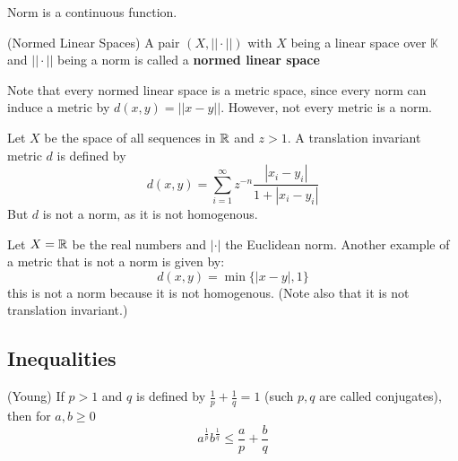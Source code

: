 \documentclass{article}
\begin{document}
\begin{remark}
    Norm is a continuous function.
\end{remark}

\begin{defn}
(Normed Linear Spaces) A pair $(X, ||\cdot||)$ with $X$ being a linear space over $\mathbb{K}$ and 
                    $||\cdot||$ being a norm is called a \textbf{normed linear space}
\end{defn} 

Note that every normed linear space is a metric space, since every norm can induce a metric by $d(x,y)=||x-y||$. 
However, not every metric is a norm.  

\begin{eg}
    Let $X$ be the space of all sequences in $\mathbb{R}$ and $z>1$. A translation invariant metric $d$ is defined by  
    \begin{equation*}
        d(x,y) = \sum_{i=1}^{\infty} z^{-n} \dfrac{|x_i-y_i|}{1+|x_i-y_i|}
    \end{equation*}  
    But $d$ is not a norm, as it is not homogenous.
\end{eg}  

\begin{eg}
    Let $X=\mathbb{R}$ be the real numbers and $|\cdot|$ the Euclidean norm. Another example of a metric that is not a norm 
    is given by:
    \begin{equation*}
        d(x,y) = \min \{|x-y|, 1\}
    \end{equation*}  
    this is not a norm because it is not homogenous. (Note also that it is not translation invariant.)
\end{eg}  



\subsection{Inequalities}

\begin{prop}
\label{young}
(Young) If $p>1$ and $q$ is defined by $\frac{1}{p}+\frac{1}{q}=1$ (such $p,q$ are called conjugates), then for $a,b \geq 0$  
\begin{equation}
    a^{\frac{1}{p}}b^{\frac{1}{q}} \leq \frac{a}{p} + \frac{b}{q} 
\end{equation}
\end{prop}  
\end{document}
